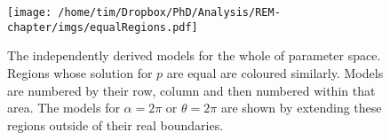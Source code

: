 

\begin{figure}[t]
\centering
\texttt{[image: /home/tim/Dropbox/PhD/Analysis/REM-chapter/imgs/equalRegions.pdf]}
\caption[REM Model numbers]{The independently derived models for the whole of parameter space. Regions whose solution for $p$ are equal are coloured similarly. Models are numbered by their row, column and then numbered within that area. The models for $\alpha = 2\pi$ or $\theta =  2\pi$ are shown by extending these regions outside of their real boundaries.}
\label{f:equalRegions}
\end{figure}

\begin{comment}
\section{Contents}
\begin{itemize}
        \item \ref{gas}: {\bf Gas model}
        \item \ref{p311}: {\bf  p311}
        \item \ref{p22}: {\bf  p22}
        \begin{itemize}
                \item \ref{p221}: {\bf  p221}
                \item \ref{p222}: {\bf  p222}
                \item \ref{p223}: {\bf  p223}
        \end{itemize}
        \item \ref{p32}: {\bf  p32}
        \begin{itemize}
                \item \ref{p321}: {\bf  p321}
                \item \ref{p322}: {\bf  p322}
                \item \ref{p323}: {\bf  p323}
        \end{itemize}
        \item \ref{p131}: {\bf  p131}
        \item \ref{p23}: {\bf  p23}
        \begin{itemize}
                \item \ref{p231}: {\bf  p231}
                \item \ref{p232}: {\bf  p232}
                \item \ref{p233}: {\bf p233}
        \end{itemize}
        \item \ref{p33}: {\bf  p33}

\end{comment}
